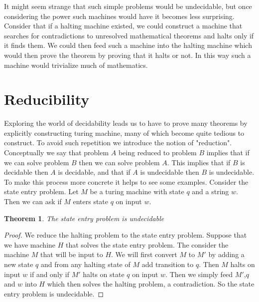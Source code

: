 \documentclass[11pt]{exam}
\newtheorem{theorem}{Theorem}[section]
\begin{document}
It might seem strange that such simple problems would be undecidable, but once considering the power such machines would have it becomes less surprising. Consider that if a halting machine existed, we could construct a machine that searches for contradictions to unresolved mathematical theorems and halts only if it finds them. We could then feed such a machine into the halting machine which would then prove the theorem by proving that it halts or not. In this way such a machine would trivialize much of mathematics. 

\newpage

\section{Reducibility}

Exploring the world of decidability leads us to have to prove many theorems by explicitly constructing turing machine, many of which become quite tedious to construct. To avoid such repetition we introduce the notion of "reduction". \\

Conceptually we say that problem $A$ being reduced to problem $B$ implies that if we can solve problem $B$ then we can solve problem $A$. This implies that if $B$ is decidable then $A$ is decidable, and that if $A$ is undecidable then $B$ is undecidable.\\

To make this process more concrete it helps to see some examples. Consider the state entry problem. Let $M$ be a turing machine with state $q$ and a string $w$. Then we can ask if $M$ enters state $q$ on input $w$. \\

\begin{theorem}
The state entry problem is undecidable
\end{theorem}

\begin{proof}
We reduce the halting problem to the state entry problem. Suppose that we have machine $H$ that solves the state entry problem. The consider the machine $M$ that will be input to $H$. We will first convert $M$ to $M'$ by adding a new state $q$ and from any halting state of $M$ add transition to $q$. Then $M$ halts on input $w$ if and only if $M'$ halts on state $q$ on input $w$. Then we simply feed $M'$,$q$ and $w$ into $H$ which then solves the halting problem, a contradiction. So the state entry problem is undecidable.
\end{proof}
\end{document}
